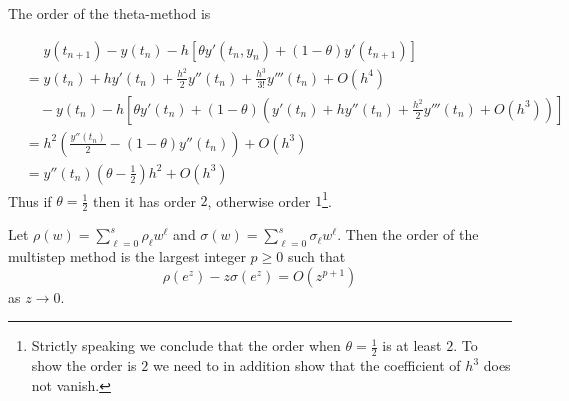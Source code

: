 \documentclass[a4paper]{article}
\begin{document}
The order of the theta-method is

\begin{align*}
  &\phantom{={} } y(t_{n + 1}) - y(t_n) - h[\theta y'(t_n, y_n) + (1 - \theta) y'(t_{n + 1})] \\
  &= y(t_n) + hy'(t_n) + \frac{h^2}{2} y''(t_n) + \frac{h^3}{3!}y'''(t_n) + O(h^4) \\
  &\quad - y(t_n) - h[\theta y'(t_n) + (1 - \theta)(y'(t_n) + hy''(t_n) + \frac{h^2}{2} y'''(t_n) + O(h^3))] \\
  &= h^2 \left( \frac{y''(t_n)}{2} - (1 - \theta)y''(t_n) \right) + O(h^3) \\
  &= y''(t_n)(\theta - \frac{1}{2})h^2 + O(h^3)
\end{align*}
Thus if \(\theta = \frac{1}{2}\) then it has order \(2\), otherwise order \(1\)\footnote{Strictly speaking we conclude that the order when \(\theta = \frac{1}{2}\) is at least \(2\). To show the order is \(2\) we need to in addition show that the coefficient of \(h^3\) does not vanish.}.

\begin{theorem}
  Let \(\rho(w) = \sum_{\ell = 0}^s \rho_\ell w^\ell\) and \(\sigma(w) = \sum_{\ell = 0}^s \sigma_\ell w^\ell\). Then the order of the multistep method is the largest integer \(p \geq 0\) such that
  \[
    \rho(e^z) - z \sigma(e^z) = O(z^{p + 1})
  \]
  as \(z \to 0\).
\end{theorem}
\end{document}
